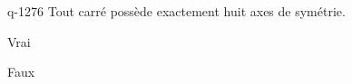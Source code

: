 \begin{truefalse}{q-1276}
Tout carré possède exactement huit axes de symétrie.
\item Vrai
\item* Faux
\end{truefalse}

